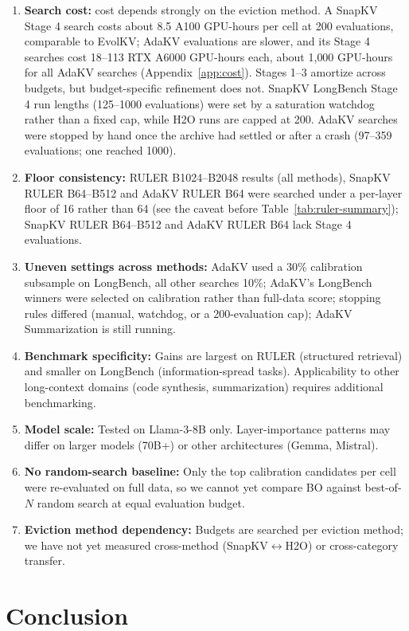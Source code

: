 \documentclass[11pt]{article}
\begin{document}
\begin{enumerate}
\item \textbf{Search cost:} cost depends strongly on the eviction method. A SnapKV Stage 4 search costs about 8.5 A100 GPU-hours per cell at 200 evaluations, comparable to EvolKV; AdaKV evaluations are slower, and its Stage 4 searches cost 18--113 RTX A6000 GPU-hours each, about 1{,}000 GPU-hours for all AdaKV searches (Appendix~\ref{app:cost}). Stages 1--3 amortize across budgets, but budget-specific refinement does not. SnapKV LongBench Stage 4 run lengths (125--1000 evaluations) were set by a saturation watchdog rather than a fixed cap, while H2O runs are capped at 200. AdaKV searches were stopped by hand once the archive had settled or after a crash (97--359 evaluations; one reached 1000).
\item \textbf{Floor consistency:} RULER B1024--B2048 results (all methods), SnapKV RULER B64--B512 and AdaKV RULER B64 were searched under a per-layer floor of 16 rather than 64 (see the caveat before Table~\ref{tab:ruler-summary}); SnapKV RULER B64--B512 and AdaKV RULER B64 lack Stage 4 evaluations.
\item \textbf{Uneven settings across methods:} AdaKV used a 30\% calibration subsample on LongBench, all other searches 10\%; AdaKV's LongBench winners were selected on calibration rather than full-data score; stopping rules differed (manual, watchdog, or a 200-evaluation cap); AdaKV Summarization is still running.
\item \textbf{Benchmark specificity:} Gains are largest on RULER (structured retrieval) and smaller on LongBench (information-spread tasks). Applicability to other long-context domains (code synthesis, summarization) requires additional benchmarking.
\item \textbf{Model scale:} Tested on Llama-3-8B only. Layer-importance patterns may differ on larger models (70B+) or other architectures (Gemma, Mistral).
\item \textbf{No random-search baseline:} Only the top calibration candidates per cell were re-evaluated on full data, so we cannot yet compare BO against best-of-$N$ random search at equal evaluation budget.
\item \textbf{Eviction method dependency:} Budgets are searched per eviction method; we have not yet measured cross-method (SnapKV$\leftrightarrow$H2O) or cross-category transfer.
\end{enumerate}

\section{Conclusion}
\end{document}

